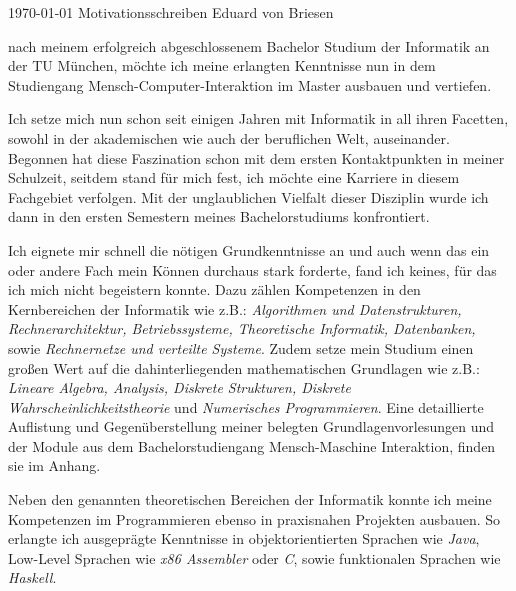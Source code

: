 \documentclass[11pt, a4paper]{awesome-cv}
\begin{document}
\makecvheader[R]

\makecvfooter
{\today}
{Motivationsschreiben}
{Eduard von Briesen}

\makelettertitle

\begin{cvletter}

  nach meinem erfolgreich abgeschlossenem Bachelor Studium der Informatik an der TU München, möchte ich meine erlangten Kenntnisse nun in dem Studiengang Mensch-Computer-Interaktion im Master ausbauen und vertiefen.


  Ich setze mich nun schon seit einigen Jahren mit Informatik in all ihren Facetten, sowohl in der akademischen wie auch der beruflichen Welt, auseinander.
  Begonnen hat diese Faszination schon mit dem ersten Kontaktpunkten in meiner Schulzeit, seitdem stand für mich fest, ich möchte eine Karriere in diesem Fachgebiet verfolgen.
  Mit der unglaublichen Vielfalt dieser Disziplin wurde ich dann in den ersten Semestern meines Bachelorstudiums konfrontiert.


  Ich eignete mir schnell die nötigen Grundkenntnisse an und auch wenn das ein oder andere Fach mein Können durchaus stark forderte, fand ich keines, für das ich mich nicht begeistern konnte.
  Dazu zählen Kompetenzen in den Kernbereichen der Informatik wie z.B.: \textit{Algorithmen und Datenstrukturen, Rechnerarchitektur, Betriebssysteme, Theoretische Informatik, Datenbanken,} sowie \textit{Rechnernetze und verteilte Systeme}.
  Zudem setze mein Studium einen großen Wert auf die dahinterliegenden mathematischen Grundlagen wie z.B.: \textit{Lineare Algebra, Analysis, Diskrete Strukturen, Diskrete Wahrscheinlichkeitstheorie} und \textit{Numerisches Programmieren}.
  Eine detaillierte Auflistung und Gegenüberstellung meiner belegten Grundlagenvorlesungen und der Module aus dem Bachelorstudiengang Mensch-Maschine Interaktion, finden sie im Anhang.


  Neben den genannten theoretischen Bereichen der Informatik konnte ich meine Kompetenzen im Programmieren ebenso in praxisnahen Projekten ausbauen.
  So erlangte ich ausgeprägte Kenntnisse in objektorientierten Sprachen wie \textit{Java}, Low-Level Sprachen wie \textit{x86 Assembler} oder \textit{C}, sowie funktionalen Sprachen wie \textit{Haskell}.



\end{cvletter}
\end{document}
